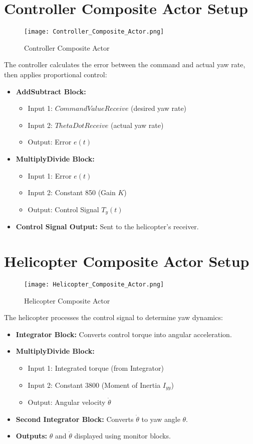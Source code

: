 \documentclass{article}
\begin{document}
\section{Controller Composite Actor Setup}
\begin{figure}
    \centering
    \texttt{[image: Controller\_Composite\_Actor.png]}
    \caption{Controller Composite Actor}
    \label{fig:controller}
\end{figure}
The controller calculates the error between the command and actual yaw rate, then applies proportional control:
\begin{itemize}
    \item \textbf{AddSubtract Block:}
    \begin{itemize}
        \item Input 1: $CommandValueReceive$ (desired yaw rate)
        \item Input 2: $ThetaDotReceive$ (actual yaw rate)
        \item Output: Error $e(t)$
    \end{itemize}
    \item \textbf{MultiplyDivide Block:}
    \begin{itemize}
        \item Input 1: Error $e(t)$
        \item Input 2: Constant 850 (Gain $K$)
        \item Output: Control Signal $T_y(t)$
    \end{itemize}
    \item \textbf{Control Signal Output:} Sent to the helicopter’s receiver.
\end{itemize}

\section{Helicopter Composite Actor Setup}
\begin{figure}
    \centering
    \texttt{[image: Helicopter\_Composite\_Actor.png]}
    \caption{Helicopter Composite Actor}
    \label{fig:helicopter}
\end{figure}
The helicopter processes the control signal to determine yaw dynamics:
\begin{itemize}
    \item \textbf{Integrator Block:} Converts control torque into angular acceleration.
    \item \textbf{MultiplyDivide Block:}
    \begin{itemize}
        \item Input 1: Integrated torque (from Integrator)
        \item Input 2: Constant 3800 (Moment of Inertia $I_{yy}$)
        \item Output: Angular velocity $\dot{\theta}$
    \end{itemize}
    \item \textbf{Second Integrator Block:} Converts $\dot{\theta}$ to yaw angle $\theta$.
    \item \textbf{Outputs:} $\theta$ and $\dot{\theta}$ displayed using monitor blocks.
\end{itemize}
\end{document}
